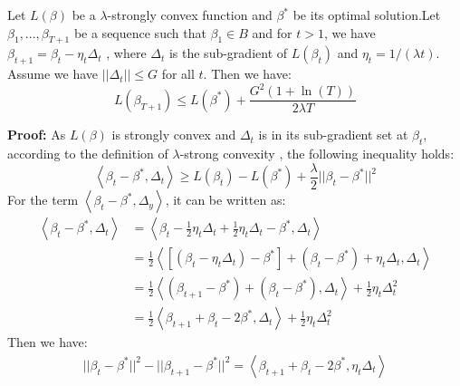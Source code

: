 \begin{theorem}\label{th:1}
Let $L(\beta)$ be a $\lambda$-strongly convex function and $\beta^*$ be its optimal solution.Let $\beta_1,...,\beta_{T+1}$ be a sequence such that $\beta_1 \in B$ and for $t>1$, we have $\beta_{t+1} = \beta_t - \eta_t \Delta_t$ , where $\Delta_t$ is the sub-gradient of $L(\beta_t)$ and $\eta_t = 1/(\lambda t)$. Assume we have $||\Delta_t|| \leq G$ for all $t$. Then we have:	
	\begin{equation}
	L(\beta_{T+1}) \leq L(\beta^*)+\frac{G^2(1+\ln (T))}{2\lambda T}
	\end{equation}
\end{theorem}
\textbf{Proof:}
	As $L(\beta)$ is strongly convex and $\Delta_t$ is in its sub-gradient set at $\beta_t$, according to the definition of $\lambda$-strong convexity \cite{rockafellar2015convex}, the following inequality holds:	
	\begin{equation}\label{eq:app:strong}
		\left\langle {\beta_t - \beta^*,\Delta_t} \right\rangle \geq L(\beta_t)-L(\beta^*)+\frac{\lambda}{2}||\beta_t - \beta^*||^2
	\end{equation} 
	For the term $\left\langle {\beta_t - \beta^*,\Delta_y} \right\rangle$, it can be written as:	
	\begin{equation} \label{eq:app:inner}
	\begin{aligned}
	\left\langle {\beta_t - \beta^*,\Delta_t} \right\rangle &= \left\langle {\beta_t - \frac{1}{2}\eta_t\Delta_t + \frac{1}{2}\eta_t\Delta_t- \beta^*,\Delta_t} \right\rangle\\
	&=\frac{1}{2}\left\langle {\left[ {\left( {{\beta _t} - {\eta _t}{\Delta _t}} \right) - {\beta ^*}} \right] + \left( {{\beta _t} - {\beta ^*}} \right) + {\eta _t}{\Delta _t},{\Delta _t}} \right\rangle \\
	&= \frac{1}{2}\left\langle {\left( {{\beta _{t + 1}} - {\beta ^*}} \right) + \left( {{\beta _t} - {\beta ^*}} \right),{\Delta _t}} \right\rangle  + \frac{1}{2}{\eta _t}\Delta _t^2\\
	&=\frac{1}{2}\left\langle {{\beta _{t + 1}} + {\beta _t} - 2{\beta ^*},{\Delta _t}} \right\rangle  + \frac{1}{2}{\eta _t}\Delta _t^2
	\end{aligned}
	\end{equation}	
	Then we have:
	\begin{equation}\label{eq:app:squrediff}
	\begin{aligned}
	||\beta_t-\beta^*||^2-||\beta_{t+1}-\beta^*||^2 
	=\left\langle {{\beta _{t + 1}} + {\beta _t} - 2{\beta ^*},{\eta_t\Delta _t}} \right\rangle
	\end{aligned}
	\end{equation}
